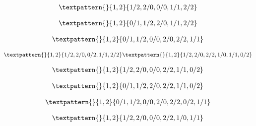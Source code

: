 \begin{equation}
	\begin{gathered}
		\textpattern{}{1,2}{1/2,2/0,0/0,1/1,2/2}
	\end{gathered}
	\label{cls:134}
\end{equation}

\begin{equation}
	\begin{gathered}
		\textpattern{}{1,2}{0/1,1/2,2/0,1/1,2/2}
	\end{gathered}
	\label{cls:135}
\end{equation}

\begin{equation}
	\begin{gathered}
		\textpattern{}{1,2}{0/1,1/2,0/0,2/0,2/2,1/1}
	\end{gathered}
	\label{cls:136}
\end{equation}

\begin{equation}
	\begin{gathered}
		\textpattern{}{1,2}{1/2,2/0,0/2,1/1,2/2}
		\textpattern{}{1,2}{1/2,2/0,2/2,1/0,1/1,0/2}
	\end{gathered}
	\label{cls:137}
\end{equation}

\begin{equation}
	\begin{gathered}
		\textpattern{}{1,2}{1/2,2/0,0/0,2/2,1/1,0/2}
	\end{gathered}
	\label{cls:138}
\end{equation}

\begin{equation}
	\begin{gathered}
		\textpattern{}{1,2}{0/1,1/2,2/0,2/2,1/1,0/2}
	\end{gathered}
	\label{cls:139}
\end{equation}

\begin{equation}
	\begin{gathered}
		\textpattern{}{1,2}{0/1,1/2,0/0,2/0,2/2,0/2,1/1}
	\end{gathered}
	\label{cls:140}
\end{equation}

\begin{equation}
	\begin{gathered}
		\textpattern{}{1,2}{1/2,2/0,0/0,2/2,1/0,1/1}
	\end{gathered}
	\label{cls:141}
\end{equation}

